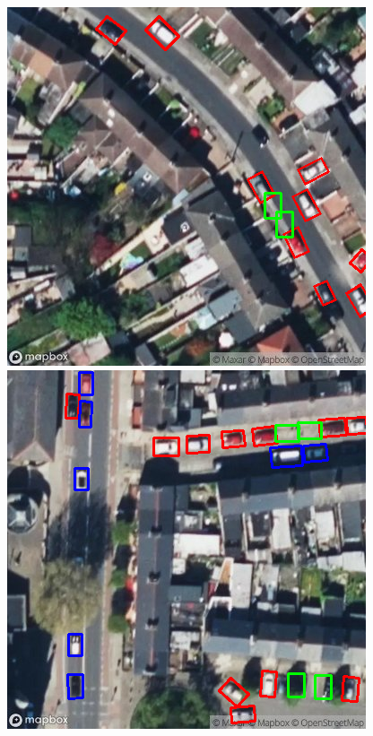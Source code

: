 \begin{figure}[htbp]
    \centering
    \begin{minipage}{0.45\textwidth}
        \centering
        \includegraphics[width=\textwidth]{images/empty_parking1.png}
    \end{minipage}
    \hfill
    \begin{minipage}{0.45\textwidth}
        \centering
        \includegraphics[width=\textwidth]{images/empty_parking2.png}

\end{minipage}
\end{figure}
